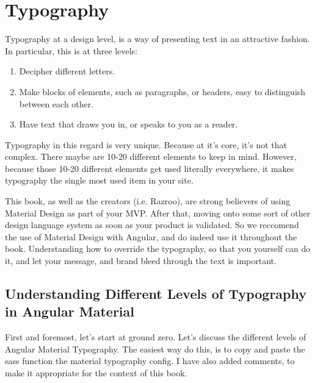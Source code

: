 \chapter{ Typography }

Typography at a design level, is a way of presenting text in an attractive 
fashion. In particular, this is at three levels: 
\begin{enumerate}
  \item Decipher different letters.
  \item Make blocks of elements, such as paragraphs, or headers, easy to 
  distinguish between each other. 
  \item Have text that draws you in, or speaks to you as a reader. 
\end{enumerate}

Typography in this regard is very unique. Because at it's core, it's 
not that complex. There maybe are 10-20 different elements to keep in
mind. However, because those 10-20 different elements get used literally 
everywhere, it makes typography the single most used item in your site. 

This book, as well as the creators (i.e. Razroo), are strong believers of 
using Material Design as part of your MVP. After that, moving onto some sort 
of other design language system as soon as your product is validated. So 
we reccomend the use of Material Design with Angular, and do indeed use it
throughout the book. Understanding how to override the typography, so that
you yourself can do it, and let your message, and brand bleed through the 
text is important. 

\section{Understanding Different Levels of Typography in Angular Material}
First and foremost, let's start at ground zero. Let's discuss the different 
levels of Angular Material Typography. The easiest way do this, is to copy 
and paste the sass function the material typography config. I have also 
added comments, to make it appropriate for the context of this book.

